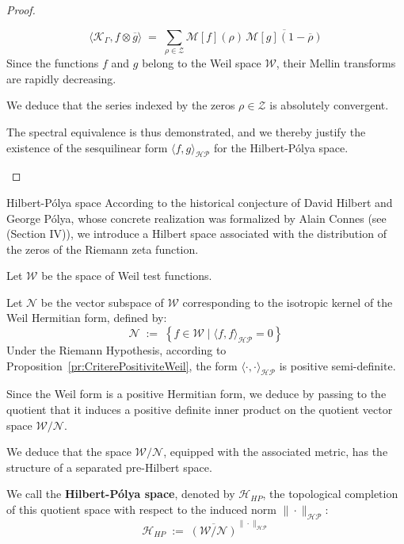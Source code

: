 \documentclass[Riemann_Hypothesis.tex]{subfiles}
\begin{document}
\begin{proof}
\begin{part_proof}
        \begin{equation*}
            \langle \mathcal{K}_{\Gamma}, f \otimes \overline{g} \rangle \;=\; \sum_{\rho \in \mathcal{Z}} \mathcal{M}[f](\rho) \, \overline{\mathcal{M}[g](1 - \overline{\rho})}
        \end{equation*}
        Since the functions $f$ and $g$ belong to the Weil space $\mathcal{W}$, their Mellin transforms are rapidly decreasing. \par
        We deduce that the series indexed by the zeros $\rho \in \mathcal{Z}$ is absolutely convergent. \par
        The spectral equivalence is thus demonstrated, and we thereby justify the existence of the sesquilinear form $\langle f, g \rangle_{\mathcal{HP}}$ for the Hilbert-Pólya space.
    \end{part_proof}
\end{proof}


\begin{DefNefEn}[label=df:EspaceHilbertPolya]{Hilbert-Pólya space}
    According to the historical conjecture of David Hilbert and George Pólya, 
    whose concrete realization was formalized by Alain Connes (see~\cite{connes1999_trace_en} (Section IV)), 
    we introduce a Hilbert space associated with the distribution of the zeros of the 
    Riemann zeta function. \par
    Let $\mathcal{W}$ be the space of Weil test functions. \par
    Let $\mathcal{N}$ be the vector subspace of $\mathcal{W}$ corresponding to the isotropic kernel of the Weil Hermitian form, defined by:
    \begin{equation*}
        \mathcal{N} \;:=\; \left\{ f \in \mathcal{W} \mid \langle f, f \rangle_{\mathcal{HP}} = 0 \right\}
    \end{equation*}
    Under the Riemann Hypothesis, according to {Proposition}~\ref{pr:CriterePositiviteWeil}, the form $\langle \cdot, \cdot \rangle_{\mathcal{HP}}$ is positive semi-definite. \par
    Since the Weil form is a positive Hermitian form, we deduce by passing to the quotient that it induces a positive definite inner product on the quotient vector space $\mathcal{W} / \mathcal{N}$. \par
    We deduce that the space $\mathcal{W} / \mathcal{N}$, equipped with the associated metric, has the structure of a separated pre-Hilbert space. \par
    We call the \textbf{Hilbert-Pólya space}, denoted by $\mathcal{H}_{HP}$, the topological completion of this quotient space with respect to the induced norm $\|\cdot\|_{\mathcal{HP}}$:
    \begin{equation*}
        \mathcal{H}_{HP} \;:=\; \overline{\left( \mathcal{W} / \mathcal{N} \right)}^{\|\cdot\|_{\mathcal{HP}}}
    \end{equation*}
\end{DefNefEn}
\end{document}
